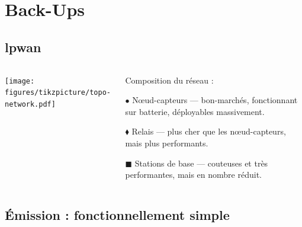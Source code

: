\documentclass[../main.tex]{subfiles}
\begin{document}
\section*{Back-Ups}

\subsection*{\acrfull{lpwan}}

\begin{frame}{}
  \begin{columns}
    \begin{column}{.5\linewidth}
      \texttt{[image: figures/tikzpicture/topo-network.pdf]}
    \end{column}
    \begin{column}{.5\linewidth}
      Composition du réseau :

      \begin{ctrlitemize}{2pt}
        \item [\textcolor{RoyalBlue3}{$\bullet$}] \textcolor{RoyalBlue3}{Nœud-capteurs   }
        --- bon-marchés, fonctionnant sur batterie, déployables massivement.
        \item [\textcolor{Chartreuse3}{$\blacklozenge$}] \textcolor{Chartreuse3}{Relais  }
        --- plus cher que les nœud-capteurs, mais plus performants.
        \item [\textcolor{Gold3}{$\blacksquare$}] \textcolor{Gold3}{Stations de base     }
        --- couteuses et très performantes, mais en nombre réduit.
      \end{ctrlitemize}
    \end{column}
  \end{columns}
\end{frame}


\subsection{Émission : fonctionnellement simple}
\end{document}
